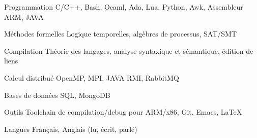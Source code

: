 


\begin{cvskills}


\cvskill
{Programmation} %
{C/C++, Bash, Ocaml, Ada, Lua, Python, Awk, Assembleur ARM, JAVA} %


\cvskill
{Méthodes formelles} %
{Logique temporelles, algèbres de processus, SAT/SMT} %


\cvskill
{Compilation}%
{Théorie des langages, analyse syntaxique et sémantique, édition de liens}


\cvskill
{Calcul distribué}%
{OpenMP, MPI, JAVA RMI, RabbitMQ}


\cvskill
{Bases de données}%
{SQL, MongoDB}


\cvskill
{Outils}%
{Toolchain de compilation/debug pour ARM/x86, Git, Emacs, \LaTeX}


\cvskill
{Langues} %
{Français, Anglais (lu, écrit, parlé)} %


\end{cvskills}